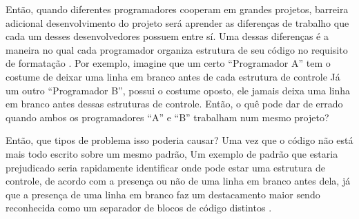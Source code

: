 {    Então,
    quando diferentes programadores cooperam em grandes projetos,
      barreira adicional  desenvolvimento do projeto será aprender as diferenças de
    trabalho que cada um desses desenvolvedores possuem entre sí.
    Uma dessas diferenças é a maneira no qual cada programador organiza estrutura de seu código
    no requisito de formatação \cite{transformationForDomainSpecificOptimisation}.
    Por exemplo,
    imagine que um certo ``Programador A'' tem o costume de deixar uma linha em
    branco antes de cada estrutura de controle Já um outro ``Programador B'',
    possui o costume oposto,
    ele jamais deixa uma linha em branco antes dessas estruturas de controle.
    Então,
    o quê pode dar de errado quando ambos os programadores ``A'' e
    ``B'' trabalham num mesmo projeto?

     Então,
    que tipos de problema isso poderia causar?
    Uma vez que o código não está mais todo escrito sobre um mesmo padrão,
    Um exemplo de padrão que estaria prejudicado
    seria rapidamente identificar onde pode estar uma estrutura de controle,
     de acordo com a presença ou não de uma linha em branco antes dela,
    já que a presença de uma linha em branco faz um destacamento maior sendo reconhecida
    como um separador de blocos de código distintos \cite{aPrettyGoodFormatting}.
}

